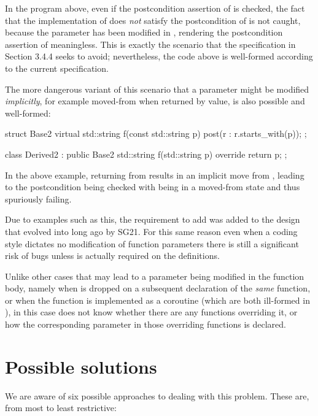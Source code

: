 In the program above, even if the postcondition assertion of  is checked, the fact that the implementation of  does \emph{not} satisfy the postcondition of  is not caught, because the parameter  has been modified in , rendering the postcondition assertion of  meaningless. This is exactly the scenario that the specification in \cite{P2900R10} Section 3.4.4 seeks to avoid; nevertheless, the code above is well-formed according to the current specification.

The more dangerous variant of this scenario that a parameter might be modified \emph{implicitly}, for example moved-from when returned by value, is also possible and well-formed:
\begin{codeblock}
struct Base2 {
  virtual std::string f(const std::string p) post(r : r.starts_with(p));
};

class Derived2 : public Base2 {
  std::string f(std::string p) override {
    return p;
  }
};
\end{codeblock}
In the above example, returning  from  results in an implicit move from , leading to the postcondition being checked with  being in a moved-from state and thus spuriously failing.

Due to examples such as this, the requirement to add  was added to the design that evolved into \cite{P2900R10} long ago by SG21. For this same reason even when a coding style dictates no modification of function parameters there is still a significant risk of bugs unless  is actually required on the definitions.

Unlike other cases that may lead to a  parameter being modified in the function body, namely when  is dropped on a subsequent declaration of the \emph{same} function, or when the function is implemented as a coroutine (which are both ill-formed in \cite{P2900R10}), in this case  does not know whether there are any functions overriding it, or how the corresponding parameter in those overriding functions is declared.

\section{Possible solutions}

We are aware of six possible approaches to dealing with this problem. These are, from most to least restrictive:

